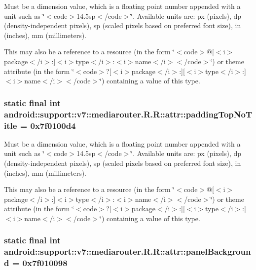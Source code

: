 Must be a dimension value, which is a floating point number appended with a unit such as \char`\"{}$<$code$>$14.5sp$<$/code$>$\char`\"{}. Available units are: px (pixels), dp (density-independent pixels), sp (scaled pixels based on preferred font size), in (inches), mm (millimeters). 

This may also be a reference to a resource (in the form \char`\"{}$<$code$>$@\mbox{[}$<$i$>$package$<$/i$>$:\mbox{]}$<$i$>$type$<$/i$>$:$<$i$>$name$<$/i$>$$<$/code$>$\char`\"{}) or theme attribute (in the form \char`\"{}$<$code$>$?\mbox{[}$<$i$>$package$<$/i$>$:\mbox{]}\mbox{[}$<$i$>$type$<$/i$>$:\mbox{]}$<$i$>$name$<$/i$>$$<$/code$>$\char`\"{}) containing a value of this type. \hypertarget{classandroid_1_1support_1_1v7_1_1mediarouter_1_1_r_1_1attr_2cff67b67694efb7b3bb11816bde5c63}{
\subsubsection[{paddingTopNoTitle}]{\setlength{\rightskip}{0pt plus 5cm}static final int android::support::v7::mediarouter.R.R::attr::paddingTopNoTitle = 0x7f0100d4}}
\label{classandroid_1_1support_1_1v7_1_1mediarouter_1_1_r_1_1attr_2cff67b67694efb7b3bb11816bde5c63}


Must be a dimension value, which is a floating point number appended with a unit such as \char`\"{}$<$code$>$14.5sp$<$/code$>$\char`\"{}. Available units are: px (pixels), dp (density-independent pixels), sp (scaled pixels based on preferred font size), in (inches), mm (millimeters). 

This may also be a reference to a resource (in the form \char`\"{}$<$code$>$@\mbox{[}$<$i$>$package$<$/i$>$:\mbox{]}$<$i$>$type$<$/i$>$:$<$i$>$name$<$/i$>$$<$/code$>$\char`\"{}) or theme attribute (in the form \char`\"{}$<$code$>$?\mbox{[}$<$i$>$package$<$/i$>$:\mbox{]}\mbox{[}$<$i$>$type$<$/i$>$:\mbox{]}$<$i$>$name$<$/i$>$$<$/code$>$\char`\"{}) containing a value of this type. \hypertarget{classandroid_1_1support_1_1v7_1_1mediarouter_1_1_r_1_1attr_814ee90a8ad5bc9e9fed670aaf9f34e8}{
\subsubsection[{panelBackground}]{\setlength{\rightskip}{0pt plus 5cm}static final int android::support::v7::mediarouter.R.R::attr::panelBackground = 0x7f010098}}
\label{classandroid_1_1support_1_1v7_1_1mediarouter_1_1_r_1_1attr_814ee90a8ad5bc9e9fed670aaf9f34e8}


